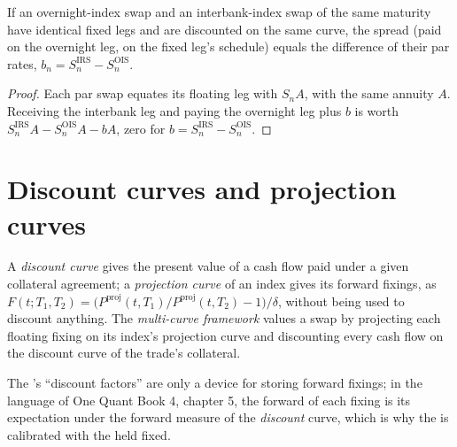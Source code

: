 \begin{proposition}\label{prop:rc:multi-curve-and-collateral-discounting:basisrates}
If an overnight-index swap and an interbank-index swap of the same maturity
have identical fixed legs and are discounted on the same curve, the  spread (paid on the overnight leg, on the fixed leg's schedule) equals
the difference of their par rates, $b_n = S^{\text{IRS}}_n - S^{\text{OIS}}_n$.
\end{proposition}
\begin{proof}
Each par swap equates its floating leg with $S_n A$, with the same annuity $A$.
Receiving the interbank leg and paying the overnight leg plus $b$ is worth
$S^{\text{IRS}}_nA - S^{\text{OIS}}_nA - bA$, zero for $b=S^{\text{IRS}}_n-S^{\text{OIS}}_n$.
\end{proof}

\section{Discount curves and projection curves}

\begin{definition}\label{def:rc:multi-curve-and-collateral-discounting:curves}
A \emph{discount curve} gives the present value of a
cash flow paid under a given collateral agreement; a \emph{projection
curve} of an index gives its forward fixings, as
$F(t;T_1,T_2) = \bigl(P^{\text{proj}}(t,T_1)/P^{\text{proj}}(t,T_2)-1\bigr)/\delta$,
without being used to discount anything. The \emph{multi-curve
framework} values a swap by projecting each
floating fixing on its index's projection curve and discounting every cash
flow on the discount curve of the trade's collateral.
\end{definition}

The 's ``discount factors'' are only a device for storing
forward fixings; in the language of One Quant Book 4, chapter 5, the forward
of each fixing is its expectation under the forward measure of the
\emph{discount} curve, which is why the  is calibrated with the
 held fixed.

